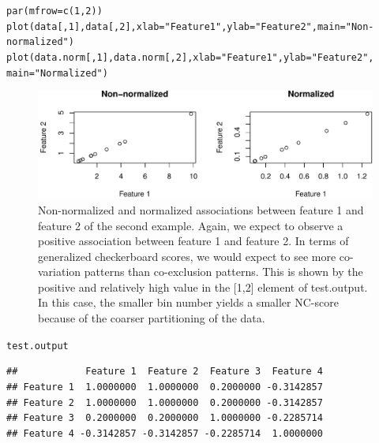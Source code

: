 \documentclass{article}\usepackage[]{graphicx}\usepackage[usenames,dvipsnames]{color}
\makeatletter
\def\maxwidth{ %
  \ifdim\Gin@nat@width>\linewidth
    \linewidth
  \else
    \Gin@nat@width
  \fi
}
\newcommand{\hlnum}[1]{\textcolor[rgb]{0.816,0.125,0.439}{#1}}%
\newcommand{\hlstr}[1]{\textcolor[rgb]{0.251,0.627,0.251}{#1}}%
\newcommand{\hlstd}[1]{\textcolor[rgb]{0.251,0.251,0.251}{#1}}%
\newcommand{\hlkwc}[1]{\textcolor[rgb]{0.251,0.251,0.251}{#1}}%
\newcommand{\hlkwd}[1]{\textcolor[rgb]{0.878,0.439,0.125}{#1}}%
\newenvironment{knitrout}{}{} %
\makeatother
\begin{document}
\begin{knitrout}
\color{fgcolor}\begin{kframe}
\begin{alltt}
\hlkwd{par}\hlstd{(}\hlkwc{mfrow}\hlstd{=}\hlkwd{c}\hlstd{(}\hlnum{1}\hlstd{,} \hlnum{2}\hlstd{))}
\hlkwd{plot}\hlstd{(data[,}\hlnum{1}\hlstd{],data[,}\hlnum{2}\hlstd{],}\hlkwc{xlab}\hlstd{=}\hlstr{"Feature 1"}\hlstd{,}\hlkwc{ylab}\hlstd{=}\hlstr{"Feature 2"}\hlstd{,}\hlkwc{main}\hlstd{=}\hlstr{"Non-normalized"}\hlstd{)}
\hlkwd{plot}\hlstd{(data.norm[,}\hlnum{1}\hlstd{],data.norm[,}\hlnum{2}\hlstd{],}\hlkwc{xlab}\hlstd{=}\hlstr{"Feature 1"}\hlstd{,}\hlkwc{ylab}\hlstd{=}\hlstr{"Feature 2"}\hlstd{,}
     \hlkwc{main}\hlstd{=}\hlstr{"Normalized"}\hlstd{)}
\end{alltt}
\end{kframe}\begin{figure}[H]
\includegraphics[width=\maxwidth]{figure/unnamed-chunk-16-1} \caption{Non-normalized and normalized associations between feature 1 and feature 2 of the second example.  Again, we expect to observe a positive association between feature 1 and feature 2.  In terms of generalized checkerboard scores, we would expect to see more co-variation patterns than co-exclusion patterns.  This is shown by the positive and relatively high value in the [1,2] element of test.output.  In this case, the smaller bin number yields a smaller NC-score because of the coarser partitioning of the data.}\label{fig:unnamed-chunk-16}
\end{figure}
\begin{kframe}\begin{alltt}
\hlstd{test.output}
\end{alltt}
\begin{verbatim}
##            Feature 1  Feature 2  Feature 3  Feature 4
## Feature 1  1.0000000  1.0000000  0.2000000 -0.3142857
## Feature 2  1.0000000  1.0000000  0.2000000 -0.3142857
## Feature 3  0.2000000  0.2000000  1.0000000 -0.2285714
## Feature 4 -0.3142857 -0.3142857 -0.2285714  1.0000000
\end{verbatim}
\end{kframe}
\end{knitrout}
\end{document}
